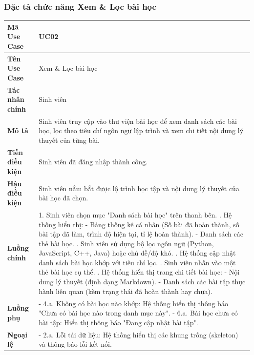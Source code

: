\documentclass[../main.tex]{subfiles}
\begin{document}
\subsubsection{Đặc tả chức năng Xem \& Lọc bài học}


{
\renewcommand{\arraystretch}{1.5}
\begin{tabularx}{\textwidth}{|p{3.5cm}|X|}
\caption{Bảng đặc tả chức năng Xem \& Lọc bài học}
\label{tab:bang-dac-ta-chuc-nang-xem-loc-bai-hoc}
\\
\hline
\textbf{Mã Use Case} & UC02 \\
\hline
\textbf{Tên Use Case} & Xem \& Lọc bài học \\
\hline
\textbf{Tác nhân chính} & Sinh viên \\
\hline
\textbf{Mô tả} & Sinh viên truy cập vào thư viện bài học để xem danh sách các bài học, lọc theo tiêu chí ngôn ngữ lập trình và xem chi tiết nội dung lý thuyết của từng bài. \\
\hline
\textbf{Tiền điều kiện} & Sinh viên đã đăng nhập thành công. \\
\hline
\textbf{Hậu điều kiện} & Sinh viên nắm bắt được lộ trình học tập và nội dung lý thuyết của bài học đã chọn. \\
\hline
\textbf{Luồng chính} & 1. Sinh viên chọn mục "Danh sách bài học" trên thanh bên. \newline 2. Hệ thống hiển thị: \newline - Bảng thống kê cá nhân (Số bài đã hoàn thành, số bài tập đã làm, trình độ hiện tại, tỉ lệ hoàn thành). \newline - Danh sách các thẻ bài học. \newline 3. Sinh viên sử dụng bộ lọc ngôn ngữ (Python, JavaScript, C++, Java) hoặc chủ đề/độ khó. \newline 4. Hệ thống cập nhật danh sách bài học khớp với tiêu chí lọc. \newline 5. Sinh viên nhấn vào một thẻ bài học cụ thể. \newline 6. Hệ thống hiển thị trang chi tiết bài học: \newline - Nội dung lý thuyết (định dạng Markdown). \newline - Danh sách các bài tập thực hành liên quan (kèm trạng thái đã hoàn thành hay chưa). \\
\hline
\textbf{Luồng phụ} & - 4.a. Không có bài học nào khớp: Hệ thống hiển thị thông báo "Chưa có bài học nào trong danh mục này". \newline - 6.a. Bài học chưa có bài tập: Hiển thị thông báo "Đang cập nhật bài tập". \\
\hline
\textbf{Ngoại lệ} & - 2.a. Lỗi tải dữ liệu: Hệ thống hiển thị các khung trống (skeleton) và thông báo lỗi kết nối. \\
\hline
\end{tabularx}
}
\end{document}
